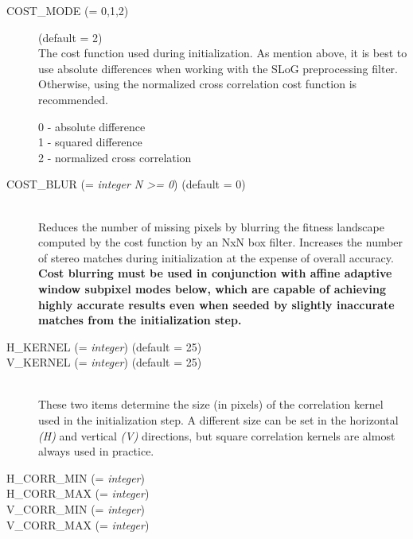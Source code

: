 \begin{description}
\item[COST\_MODE \textnormal{\small{(= 0,1,2)}}] (default = 2) \hfill \\

  The cost function used during initialization. As mention above,
  it is best to use absolute differences when working with the SLoG
  preprocessing filter. Otherwise, using the normalized cross
  correlation cost function is recommended.

  \begin{description}
    \item[0 - absolute difference]
    \item[1 - squared difference]
    \item[2 - normalized cross correlation]
  \end{description}

\item[COST\_BLUR \textnormal{\small{(= \emph{integer N >= 0})}} (default = 0)] \hfill \\

  Reduces the number of missing pixels by blurring the fitness
  landscape computed by the cost function by an NxN box filter.
  Increases the number of stereo matches during initialization at the
  expense of overall accuracy.  {\bf Cost blurring must be used in
    conjunction with affine adaptive window subpixel modes below,
    which are capable of achieving highly accurate results even when
    seeded by slightly inaccurate matches from the initialization
    step.}

\item[H\_KERNEL \textnormal{\small{(= \emph{integer})}} (default = 25)]
\item[V\_KERNEL \textnormal{\small{(= \emph{integer})}} (default = 25)] \hfill \\

  These two items determine the size (in pixels) of the correlation
  kernel used in the initialization step.  A different size can be set
  in the horizontal \emph{(H)} and vertical \emph{(V)} directions, but
  square correlation kernels are almost always used in practice.

\item[H\_CORR\_MIN \textnormal{\small{(= \emph{integer})}}]
\item[H\_CORR\_MAX \textnormal{\small{(= \emph{integer})}}]
\item[V\_CORR\_MIN \textnormal{\small{(= \emph{integer})}}]
\item[V\_CORR\_MAX \textnormal{\small{(= \emph{integer})}}] \hfill \\


\end{description}
